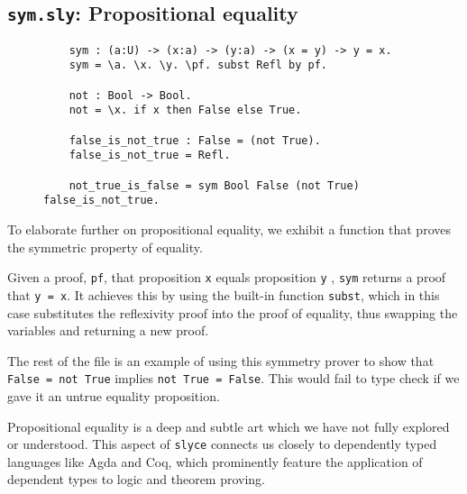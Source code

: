 \subsection{\texttt{sym.sly}: Propositional equality}
\begin{figure}[h!]
\begin{lstlisting}
    sym : (a:U) -> (x:a) -> (y:a) -> (x = y) -> y = x.
    sym = \a. \x. \y. \pf. subst Refl by pf.

    not : Bool -> Bool.
    not = \x. if x then False else True.

    false_is_not_true : False = (not True).
    false_is_not_true = Refl.

    not_true_is_false = sym Bool False (not True) false_is_not_true.
\end{lstlisting}
\end{figure}
To elaborate further on propositional equality, we exhibit a function that
proves the symmetric property of equality.

Given a proof, \texttt{pf}, that proposition \texttt{x} equals proposition \texttt{y}
, \texttt{sym} returns a proof that \texttt{y = x}.
It achieves this by using the built-in function \texttt{subst}, which in this
case substitutes the reflexivity proof into the proof of equality, thus
swapping the variables and returning a new proof.

The rest of the file is an example of using this symmetry prover to show that
\texttt{False = not True} implies \texttt{not True = False}. This would fail to
type check if we gave it an untrue equality proposition.

Propositional equality is a deep and subtle art which we have not fully
explored or understood. This aspect of \texttt{slyce} connects us closely to
dependently typed languages like Agda and Coq, which prominently feature the
application of dependent types to logic and theorem proving.
